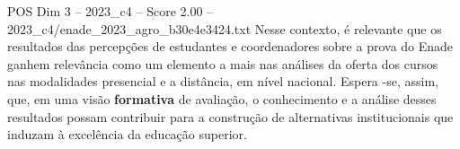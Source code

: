 \begin{textsample}{POS Dim 3 – 2023\_c4 – Score 2.00 – 2023\_c4/enade\_2023\_agro\_b30e4e3424.txt}
Nesse contexto, é relevante que os resultados das percepções de estudantes e coordenadores sobre a prova do Enade ganhem relevância como um elemento a mais nas análises da oferta dos cursos nas modalidades presencial e a distância, em nível nacional.
Espera -se, assim, que, em uma visão \textbf{formativa} de avaliação, o conhecimento e a análise desses resultados possam contribuir para a construção de alternativas institucionais que induzam à excelência da educação superior.

\end{textsample}
